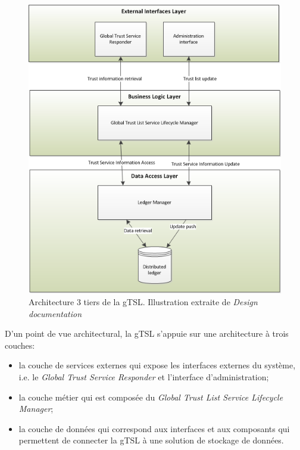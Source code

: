 \documentclass{tnreport}
\begin{document}
\clearpage
\begin{figure}[h]
	\centering
	\includegraphics[scale=0.83]{figures/gTSL-3Tier}
	\caption{Architecture 3 tiers de la gTSL. Illustration extraite de \textit{Design documentation}~\cite{design-document}}
	\label{fig:3tier-archi}
\end{figure}

D'un point de vue architectural, la gTSL s'appuie sur une architecture à trois couches:
\begin{itemize}
	\item la couche de services externes qui expose les interfaces externes du système, i.e. le \textit{Global Trust Service Responder} et l'interface d'administration;
	\item la couche métier qui est composée du \textit{Global Trust List Service Lifecycle Manager};
	\item la couche de données qui correspond aux interfaces et aux composants qui permettent de connecter la gTSL à une solution de stockage de données.
\end{itemize}

\iffalse
\end{document}
